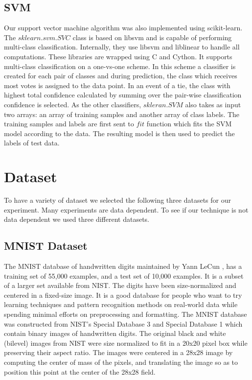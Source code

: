 \subsection{SVM}
Our support vector machine algorithm was also implemented using scikit-learn. The $sklearn.svm.SVC$ class is based on libsvm and is capable of performing multi-class classification. Internally, they use libsvm and liblinear to handle all computations. These libraries are wrapped using C and Cython. It supports multi-class classification on a one-vs-one scheme. In this scheme a classifier is created for each pair of classes and during prediction, the class which receives most votes is assigned to the data point. In an event of a tie, the class with highest total confidence calculated by summing over the pair-wise classification confidence is selected. 
As the other classifiers, $skleran.SVM$ also takes as input two arrays: an array of training samples and another array of class labels. The training samples and labels are first sent to $fit$ function which fits the SVM model according to the data. The resulting model is then used to predict the labels of test data. 

\section{Dataset}\label{dataset}
To have a variety of dataset we selected the following three datasets for our experiment.
Many experiments are data dependent. To see if our technique is not data dependent we used three different datasets.
\subsection{MNIST Dataset}
The MNIST database of handwritten digits maintained by Yann LeCun \cite{MNIST}, has a training set of 55,000 examples, and a test set of 10,000 examples. It is a subset of a larger set available from NIST. The digits have been size-normalized and centered in a fixed-size image. It is a good database for people who want to try learning techniques and pattern recognition methods on real-world data while spending minimal efforts on preprocessing and formatting. The MNIST database was constructed from NIST's Special Database 3 and Special Database 1 which contain binary images of handwritten digits. The original black and white (bilevel) images from NIST were size normalized to fit in a 20x20 pixel box while preserving their aspect ratio. The images were centered in a 28x28 image by computing the center of mass of the pixels, and translating the image so as to position this point at the center of the 28x28 field.

